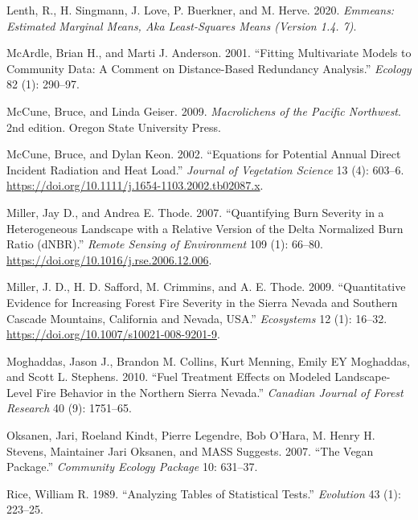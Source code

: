 \documentclass[]{article}
\begin{document}
\leavevmode\hypertarget{ref-lenthEmmeansEstimatedMarginal2020}{}%
Lenth, R., H. Singmann, J. Love, P. Buerkner, and M. Herve. 2020.
\emph{Emmeans: Estimated Marginal Means, Aka Least-Squares Means
(Version 1.4. 7)}.

\leavevmode\hypertarget{ref-mcardleFittingMultivariateModels2001}{}%
McArdle, Brian H., and Marti J. Anderson. 2001. ``Fitting Multivariate
Models to Community Data: A Comment on Distance-Based Redundancy
Analysis.'' \emph{Ecology} 82 (1): 290--97.

\leavevmode\hypertarget{ref-mccuneMacrolichensPacificNorthwest2009}{}%
McCune, Bruce, and Linda Geiser. 2009. \emph{Macrolichens of the Pacific
Northwest}. 2nd edition. Oregon State University Press.

\leavevmode\hypertarget{ref-mccuneEquationsPotentialAnnual2002}{}%
McCune, Bruce, and Dylan Keon. 2002. ``Equations for Potential Annual
Direct Incident Radiation and Heat Load.'' \emph{Journal of Vegetation
Science} 13 (4): 603--6.
\url{https://doi.org/10.1111/j.1654-1103.2002.tb02087.x}.

\leavevmode\hypertarget{ref-millerQuantifyingBurnSeverity2007}{}%
Miller, Jay D., and Andrea E. Thode. 2007. ``Quantifying Burn Severity
in a Heterogeneous Landscape with a Relative Version of the Delta
Normalized Burn Ratio (dNBR).'' \emph{Remote Sensing of Environment} 109
(1): 66--80. \url{https://doi.org/10.1016/j.rse.2006.12.006}.

\leavevmode\hypertarget{ref-millerQuantitativeEvidenceIncreasing2009}{}%
Miller, J. D., H. D. Safford, M. Crimmins, and A. E. Thode. 2009.
``Quantitative Evidence for Increasing Forest Fire Severity in the
Sierra Nevada and Southern Cascade Mountains, California and Nevada,
USA.'' \emph{Ecosystems} 12 (1): 16--32.
\url{https://doi.org/10.1007/s10021-008-9201-9}.

\leavevmode\hypertarget{ref-moghaddasFuelTreatmentEffects2010}{}%
Moghaddas, Jason J., Brandon M. Collins, Kurt Menning, Emily EY
Moghaddas, and Scott L. Stephens. 2010. ``Fuel Treatment Effects on
Modeled Landscape-Level Fire Behavior in the Northern Sierra Nevada.''
\emph{Canadian Journal of Forest Research} 40 (9): 1751--65.

\leavevmode\hypertarget{ref-oksanenVeganPackage2007}{}%
Oksanen, Jari, Roeland Kindt, Pierre Legendre, Bob O'Hara, M. Henry H.
Stevens, Maintainer Jari Oksanen, and MASS Suggests. 2007. ``The Vegan
Package.'' \emph{Community Ecology Package} 10: 631--37.

\leavevmode\hypertarget{ref-riceAnalyzingTablesStatistical1989}{}%
Rice, William R. 1989. ``Analyzing Tables of Statistical Tests.''
\emph{Evolution} 43 (1): 223--25.
\end{document}
